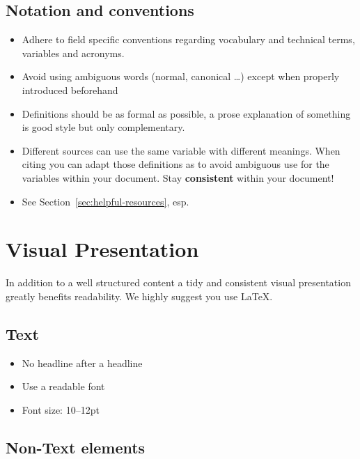 \documentclass[nodate]{proc}
\begin{document}
\subsection{Notation and conventions}

\begin{itemize}
	\item Adhere to field specific conventions regarding vocabulary and technical terms, variables and acronyms.
	\item Avoid using ambiguous words (normal, canonical \dots) except when properly introduced beforehand
	\item Definitions should be as formal as possible, a prose explanation of something is good style but only complementary.
	\item Different sources can use the same variable with different meanings. When citing you can adapt those definitions as to avoid ambiguous use for the variables within your document. Stay \textbf{consistent} within your document!
	\item See Section~\ref{sec:helpful-resources}, esp. \cite[pp. 1-8]{knuth_mathematical_writing}
\end{itemize}

\section{Visual Presentation}

In addition to a well structured content a tidy and consistent visual presentation greatly benefits readability. We highly suggest you use \LaTeX.

\subsection{Text}
\begin{itemize}
	\item No headline after a headline
	\item Use a readable font
	\item Font size: 10--12pt
\end{itemize}

\subsection{Non-Text elements}
\end{document}
